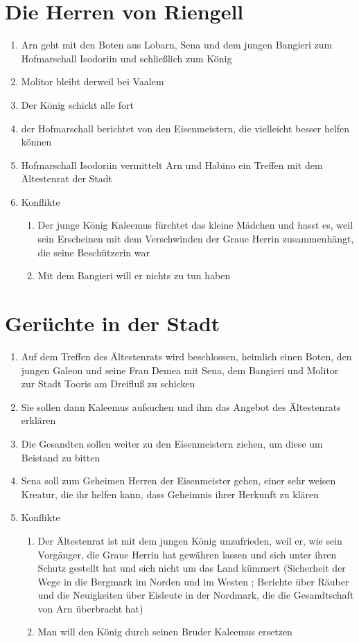 \documentclass[12pt,a4paper,onecolumn,oneside,ngerman]{book}
\newcommand{\Molitor}{Molitor}
\newcommand{\Sena}{Sena}
\newcommand{\Bangiri}{Bangieri}
\newcommand{\Lobarn}{Lobarn}
\newcommand{\Nordmark}{Nordmark}
\newcommand{\Bergmark}{Bergmark}
\newcommand{\Arn}{Arn}
\newcommand{\Eisleute}{Eisleute}
\newcommand{\Rhingell}{Riengell}
\newcommand{\Habino}{Habino}
\newcommand{\Valem}{Vaalem}
\newcommand{\Kalemus}{Kaleemus}
\newcommand{\Isodoriin}{Isodoriin}
\newcommand{\Galeon}{Galeon}
\newcommand{\Demea}{Demea}
\newcommand{\Dreifluss}{Dreifluß}
\newcommand{\Toris}{Tooris}
\newcommand{\Eisenmeister}{Eisenmeister}
\begin{document}
\chapter{Die Herren von \Rhingell}
\begin{enumerate}
  \item {\Arn} geht mit den Boten aus {\Lobarn}, {\Sena} und dem jungen {\Bangiri} zum Hofmarschall {\Isodoriin} und schließlich zum König
  \item {\Molitor} bleibt derweil bei {\Valem}
  \item Der König schickt alle fort
  \item der Hofmarschall berichtet von den {\Eisenmeister}n, die vielleicht besser helfen können
  \item Hofmarschall {\Isodoriin} vermittelt {\Arn} und {\Habino} ein Treffen mit dem Ältestenrat der Stadt
  \item Konflikte
  \begin{enumerate}
    \item Der junge König {\Kalemus} fürchtet das kleine Mädchen und hasst es, weil sein Erscheinen mit dem Verschwinden der Graue Herrin zusammenhängt, die seine Beschützerin war
    \item Mit dem {\Bangiri} will er nichts zu tun haben
  \end{enumerate}
\end{enumerate}

\chapter{Gerüchte in der Stadt}
\begin{enumerate}
  \item Auf dem Treffen des Ältestenrats wird beschlossen, heimlich einen Boten, den jungen {\Galeon} und seine Frau {\Demea} mit {\Sena}, dem {\Bangiri} und {\Molitor} zur Stadt {\Toris} am {\Dreifluss} zu schicken
  \item Sie sollen dann {\Kalemus} aufsuchen und ihm das Angebot des Ältestenrats erklären
  \item Die Gesandten sollen weiter zu den {\Eisenmeister}{n} ziehen, um diese um Beistand zu bitten
  \item {\Sena} soll zum Geheimen Herren der {\Eisenmeister} gehen, einer sehr weisen Kreatur, die ihr helfen kann, dass Geheimnis ihrer Herkunft zu klären
  \item Konflikte
  \begin{enumerate}
    \item Der Ältestenrat ist mit dem jungen König unzufrieden, weil er, wie sein Vorgänger, die Graue Herrin hat gewähren lassen und sich unter ihren Schutz gestellt hat und sich nicht um das Land kümmert (Sicherheit der Wege in die {\Bergmark} im Norden und im Westen ; Berichte über Räuber und die Neuigkeiten über {\Eisleute} in der {\Nordmark}, die die Gesandtschaft von {\Arn} überbracht hat)
    \item Man will den König durch seinen Bruder {\Kalemus} ersetzen 
  \end{enumerate}
\end{enumerate}
\end{document}
